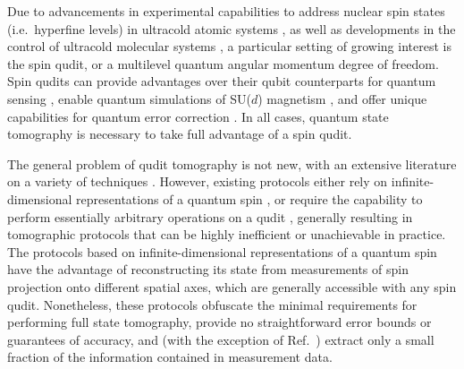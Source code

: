 \documentclass[a4paper,twocolumn,unpublished]{quantumarticle}
\begin{document}
Due to advancements in experimental capabilities to address nuclear spin states (i.e.~hyperfine levels) in ultracold atomic systems \cite{daley2011quantum, mischuck2012control, smith2013quantum, cazalilla2014ultracold}, as well as developments in the control of ultracold molecular systems \cite{bohn2017cold, zeppenfeld2012sisyphus, kozyryev2017sisyphus, puri2017synthesis, wu2017cryofuge, marco2019degenerate, liu2019molecular, anderegg2019optical, chou2020frequencycomb, lin2020quantum}, a particular setting of growing interest is the spin qudit, or a multilevel quantum angular momentum degree of freedom.
Spin qudits can provide advantages over their qubit counterparts for quantum sensing \cite{hemmer2018squeezing, evrard2019enhanced}, enable quantum simulations of SU($d$) magnetism \cite{cazalilla2014ultracold, banerjee2013atomic, zhang2014spectroscopic, scazza2014observation, goban2018emergence}, and offer unique capabilities for quantum error correction \cite{albert2020robust, gross2020encoding}.
In all cases, quantum state tomography is necessary to take full advantage of a spin qudit.


The general problem of qudit tomography is not new, with an extensive literature on a variety of techniques \cite{manko1997spin, schmied2011tomographic, evrard2019enhanced, flammia2005minimal, thew2002qudit, salazar2012quantum, sosa-martinez2017quantum, ha2018minimal, stefano2019set, palici2020oam}.
However, existing protocols either rely on infinite-dimensional representations of a quantum spin \cite{manko1997spin, schmied2011tomographic, evrard2019enhanced}, or require the capability to perform essentially arbitrary operations on a qudit \cite{thew2002qudit, flammia2005minimal, salazar2012quantum, sosa-martinez2017quantum, ha2018minimal, stefano2019set, palici2020oam}, generally resulting in tomographic protocols that can be highly inefficient or unachievable in practice.
The protocols based on infinite-dimensional representations of a quantum spin have the advantage of reconstructing its state from measurements of spin projection onto different spatial axes, which are generally accessible with any spin qudit.
Nonetheless, these protocols obfuscate the minimal requirements for performing full state tomography, provide no straightforward error bounds or guarantees of accuracy, and (with the exception of Ref.~\cite{schmied2011tomographic}) extract only a small fraction of the information contained in measurement data.
\end{document}
